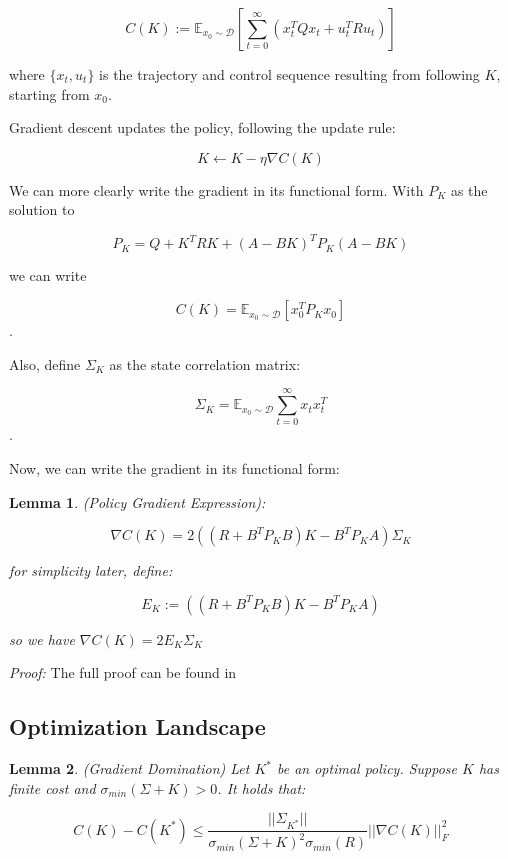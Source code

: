 \documentclass{article}[12pt]
\newtheorem{lemma}{Lemma}
\def\E{\mathbb{E}}
\def \E{\mathbb E}
\begin{document}
\begin{equation}
C(K) := \E_{x_0 \sim \mathcal{D}} \left[ \sum_{t=0}^\infty (x_t^TQx_t + u_t^TRu_t)\right]
\end{equation}

where $\{x_t,u_t\}$ is the trajectory and control sequence resulting from following $K$, starting from $x_0$.

Gradient descent updates the policy, following the update rule:

$$ K \leftarrow K - \eta \nabla C(K)$$

We can more clearly write the gradient in its functional form. With $P_K$ as the solution to

$$P_K = Q + K^TRK + (A-BK)^TP_K(A-BK)$$

we can write 

$$C(K) = \E_{x_0 \sim \mathcal{D}} \left[x_0^TP_Kx_0\right]$$.

Also, define $\Sigma_K$ as the state correlation matrix:

$$\Sigma_K = \E_{x_0 \sim \mathcal{D}} \sum_{t=0}^\infty x_tx_t^T$$.

Now, we can write the gradient in its functional form:

\begin{lemma} (Policy Gradient Expression):

$$\nabla C(K) = 2\left((R+B^TP_KB)K-B^TP_KA\right)\Sigma_K$$

for simplicity later, define:

$$E_K := \left((R+B^TP_KB)K-B^TP_KA\right)$$

so we have $\nabla C(K) = 2E_K\Sigma_K$

\label{lemma1}
\end{lemma}

\textit{Proof:}
The full proof can be found in \cite{Fazel2018}


\subsection{Optimization Landscape}

\begin{lemma} (Gradient Domination)
\label{gradlemma}
Let $K^*$ be an optimal policy. Suppose $K$ has finite cost and $\sigma_{min}(\Sigma+K)>0$. It holds that:

$$ C(K)- C(K^*) \leq \frac{||\Sigma_{K^*}||}{\sigma_{min}(\Sigma+K)^2\sigma_{min}(R)}||\nabla C(K)||_F^2$$
\end{lemma}
\end{document}
